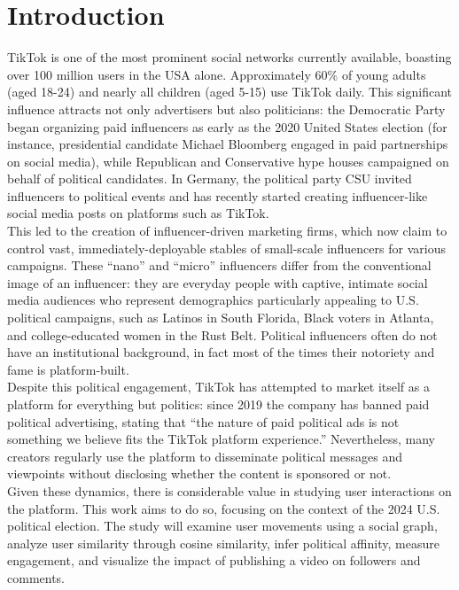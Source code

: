 \section*{Introduction}
TikTok is one of the most prominent social networks currently available, boasting over 100 million users in the USA alone\cite{tktkStat}. Approximately 60\% of young adults (aged 18-24) and nearly all children (aged 5-15) use TikTok daily\cite{https://doi.org/10.1002/poi3.287}. This significant influence attracts not only advertisers but also politicians: the Democratic Party began organizing paid influencers as early as the 2020 United States election (for instance, presidential candidate Michael Bloomberg engaged in paid partnerships on social media\cite{10.3389/fcomm.2021.752656}), while Republican and Conservative hype houses campaigned on behalf of political candidates. In Germany, the political party CSU invited influencers to political events and has recently started creating influencer-like social media posts on platforms such as TikTok\cite{10.3389/fcomm.2021.752656}.\\
This led to the creation of influencer-driven marketing firms, which now claim to control vast, immediately-deployable stables of small-scale influencers for various campaigns. These “nano” and “micro” influencers differ from the conventional image of an influencer: they are everyday people with captive, intimate social media audiences who represent demographics particularly appealing to U.S. political campaigns, such as Latinos in South Florida, Black voters in Atlanta, and college-educated women in the Rust Belt\cite{theHilltktk}. Political influencers often do not have an institutional background, in fact most of the times their notoriety and fame is platform-built\cite{doi:10.1177/20563051231177938}.\\
Despite this political engagement, TikTok has attempted to market itself as a platform for everything but politics: since 2019 the company has banned paid political advertising, stating that “the nature of paid political ads is not something we believe fits the TikTok platform experience.” Nevertheless, many creators regularly use the platform to disseminate political messages and viewpoints without disclosing whether the content is sponsored or not\cite{mozilla,politico}.\\
Given these dynamics, there is considerable value in studying user interactions on the platform. This work aims to do so, focusing on the context of the 2024 U.S. political election. The study will examine user movements using a social graph, analyze user similarity through cosine similarity, infer political affinity, measure engagement, and visualize the impact of publishing a video on followers and comments.